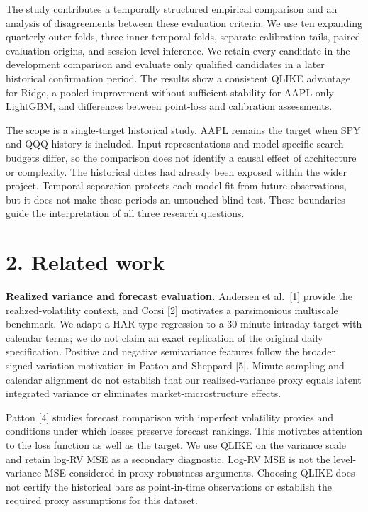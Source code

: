 The study contributes a temporally structured empirical comparison and
an analysis of disagreements between these evaluation criteria. We use
ten expanding quarterly outer folds, three inner temporal folds,
separate calibration tails, paired evaluation origins, and session-level
inference. We retain every candidate in the development comparison and
evaluate only qualified candidates in a later historical confirmation
period. The results show a consistent QLIKE advantage for Ridge, a
pooled improvement without sufficient stability for AAPL-only LightGBM,
and differences between point-loss and calibration assessments.

The scope is a single-target historical study. AAPL remains the target
when SPY and QQQ history is included. Input representations and
model-specific search budgets differ, so the comparison does not
identify a causal effect of architecture or complexity. The historical
dates had already been exposed within the wider project. Temporal
separation protects each model fit from future observations, but it does
not make these periods an untouched blind test. These boundaries guide
the interpretation of all three research questions.

\section{2. Related work}\label{related-work}

\textbf{Realized variance and forecast evaluation.} Andersen et
al.~{[}1{]} provide the realized-volatility context, and Corsi {[}2{]}
motivates a parsimonious multiscale benchmark. We adapt a HAR-type
regression to a 30-minute intraday target with calendar terms; we do not
claim an exact replication of the original daily specification. Positive
and negative semivariance features follow the broader signed-variation
motivation in Patton and Sheppard {[}5{]}. Minute sampling and calendar
alignment do not establish that our realized-variance proxy equals
latent integrated variance or eliminates market-microstructure effects.

Patton {[}4{]} studies forecast comparison with imperfect volatility
proxies and conditions under which losses preserve forecast rankings.
This motivates attention to the loss function as well as the target. We
use QLIKE on the variance scale and retain log-RV MSE as a secondary
diagnostic. Log-RV MSE is not the level-variance MSE considered in
proxy-robustness arguments. Choosing QLIKE does not certify the
historical bars as point-in-time observations or establish the required
proxy assumptions for this dataset.

